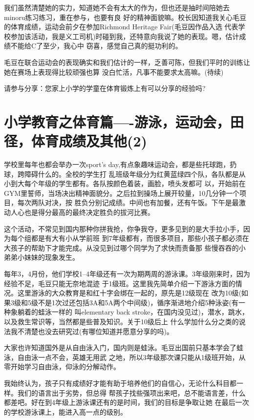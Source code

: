 \documentclass[11pt,a4paper,onecolumn]{article}
\begin{document}
我们虽然清楚她的实力，知道她不会有太大的作为，但也还是抽时间陪她去minoru练习练习，重在参与，也要有良
好的精神面貌嘛。校长因知道我关心毛豆的体育成绩，运动会前夕在参加Richmond Heritage Fair(毛豆因作品入选
代表学校参加该活动，我是义工司机)时碰到我，还特意向我说了她的表现。嗯，估计成绩不能给C了至少，我心中
窃喜，感觉自己真的挺功利的。


毛豆在联合运动会的表现确实和我们估计的一样，乏善可陈，但我们平时的训练让她在赛场上表现得比较顽强也算
没白忙活，凡事不能要求太高嘛。(待续)



请参与分享：您家上小学的学童在体育锻炼上有可以分享的经验吗?

\section{小学教育之体育篇----游泳，运动会，田径，体育成绩及其他(2)}


学校里每年也都会举办一次sport's day,有点象趣味运动会，都是些托球跑，扔球，跨障碍什么的。全校的学生打
乱班级年级分为红黄蓝绿四个队，各队都是从小到大每个年级的学生都有。各队按颜色着装，画脸，喷头发都可
以，开始前在GYM里誓师，当场决出精神面貌分。之后拉到操场上展开较量，10几分钟一个项目，每次两队对决，按
胜负分别记成绩。中间也有加餐，还有午饭。下午是最激动人心也是得分最高的最终决定胜负的拔河比赛。


这个活动，不常见到国内那种你拼我抢，你争我夺，更多见到的是大手拉小手，因为每个组都是有大有小从学前班
到7年级都有，而很多项目，那些小孩子都必须在大孩子的帮助下才能完成。从没见到过哪个同学为了求快而责备那
些慢吞吞的小弟弟小妹妹的现象发生。


每年3，4月份，他们学校1--4年级还有一次为期两周的游泳课。3年级刚来时，因为经验不足，毛豆只能无奈地混迹
于1级班。这里我先简单介绍一下游泳方面的情况。这里游泳的大众教育是和红十字会绑在一起的，原先是12级现在
改为10级(如果3级和5级不是1次过还包括3A和5A两个中间级)，循序渐进地介绍5种泳姿(有一种象躺着的蛙泳一样的
叫elementary back stroke，在国内没见过)，潜水，跳水，以及救生常识等，当然都是些普及知识。关于10级后上
什么学加什么分之类的说法我不清楚也没去研究过(有哪位知道并愿意分享的吗)。


大家也许知道国外是从自由泳入门，国内则是蛙泳。毛豆出国前只基本学会了蛙泳，自由泳一点不会，英雄无用武
之地，所以3年级那次课只能从1级班开始，从零开始学习自由泳，仰泳的分解动作。


我始终认为，孩子只有成绩好才能有助于培养他们的自信心，无论什么科目都一样。我们的语言出于劣势，但总得
帮孩子找些强项出来吧，总不能语言差，什么都差吧。好在到4年级上游泳课还有的是时间，我们的目标是争取让她
在最后一次的学校游泳课上，能进入高一点的级别。
\end{document}
